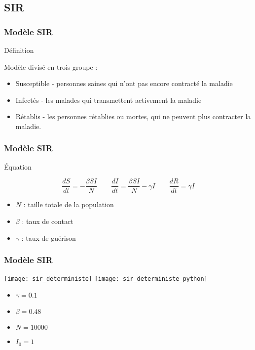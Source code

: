 \subsection{SIR}

\begin{frame}
        \frametitle{Modèle SIR}

        \begin{block}{Définition}

                Modèle divisé en trois groupe :
                \begin{itemize}
                        \item Susceptible - personnes saines qui n'ont pas encore contracté la maladie
                        \item Infectés - les malades qui transmettent activement la maladie
                        \item Rétablis - les personnes rétablies ou mortes, qui ne peuvent plus contracter la maladie.
                \end{itemize}

        \end{block}
\end{frame}

\begin{frame}
        \frametitle{Modèle SIR}

        \begin{alertblock}{Équation}

                $$ \frac{dS}{dt} = -\frac{\beta SI}{N} \qquad \frac{dI}{dt} = \frac{\beta SI}{N} - \gamma I \qquad \frac{dR}{dt} = \gamma I $$

                \begin{itemize}
                        \item $N$ : taille totale de la population
                        \item $\beta$ : taux de contact
                        \item $\gamma$ : taux de guérison
                \end{itemize}

        \end{alertblock}
\end{frame}

\begin{frame}
        \frametitle{Modèle SIR}
			
		\texttt{[image: sir\_deterministe]}%
		\texttt{[image: sir\_deterministe\_python]}
		
        \begin{multicols}{2}
                \begin{itemize}
                        \item $\gamma = 0.1$
                        \item $\beta = 0.48$
                        \item $N = 10000$
                        \item $I_0 = 1$
                \end{itemize}
        \end{multicols}

\end{frame}

